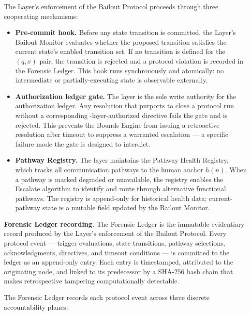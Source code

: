 The \fact{} Layer's enforcement of the Bailout Protocol proceeds through three cooperating mechanisms:

\begin{itemize}\itemsep=0pt
\item[(\textit{i})] \textbf{Pre-commit hook.} Before any state transition is committed, the \fact{} Layer's Bailout Monitor evaluates whether the proposed transition satisfies the current state's enabled transition set. If no transition is defined for the $(q, \sigma)$ pair, the transition is rejected and a protocol violation is recorded in the Forensic Ledger. This hook runs synchronously and atomically: no intermediate or partially-executing state is observable externally.

\item[(\textit{ii})] \textbf{Authorization ledger gate.} The \fact{} layer is the sole write authority for the authorization ledger. Any resolution that purports to close a protocol run without a corresponding \purpose{}-layer-authorized directive fails the gate and is rejected. This prevents the Bounds Engine from issuing a retroactive resolution after timeout to suppress a warranted escalation — a specific failure mode the gate is designed to interdict.

\item[(\textit{iii})] \textbf{Pathway Registry.} The \fact{} layer maintains the Pathway Health Registry, which tracks all communication pathways to the human anchor $h(n)$. When a pathway is marked degraded or unavailable, the registry enables the Escalate algorithm to identify and route through alternative functional pathways. The registry is append-only for historical health data; current-pathway state is a mutable field updated by the Bailout Monitor.
\end{itemize}

\medskip
\noindent\textbf{Forensic Ledger recording.} The Forensic Ledger is the immutable evidentiary record produced by the \fact{} Layer's enforcement of the Bailout Protocol. Every protocol event — trigger evaluations, state transitions, pathway selections, acknowledgments, directives, and timeout conditions — is committed to the ledger as an append-only entry. Each entry is timestamped, attributed to the originating node, and linked to its predecessor by a SHA-256 hash chain that makes retrospective tampering computationally detectable.

The Forensic Ledger records each protocol event across three discrete accountability planes:

